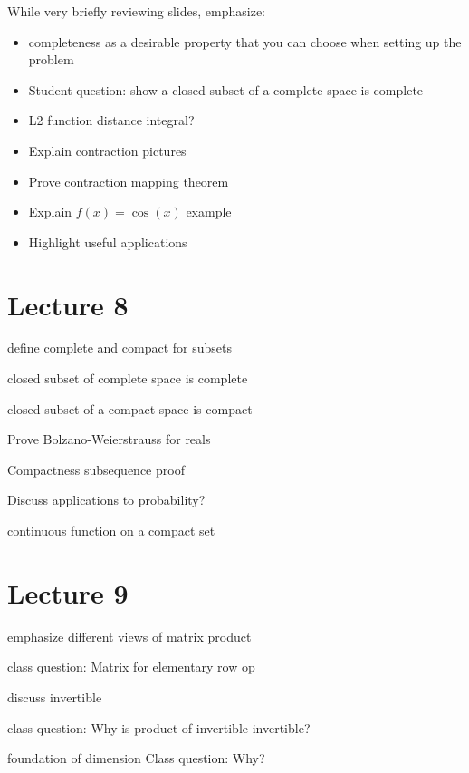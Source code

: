 \documentclass[10pt,english]{article}
\begin{document}
While very briefly reviewing slides,  emphasize:
\begin{itemize}
  \item completeness as a desirable property that you can choose when setting up the problem
  
  \item Student question: show a closed subset of a complete space is complete

  \item L2 function distance integral?

  \item Explain contraction pictures

  \item Prove contraction mapping theorem
  
  \item Explain $f(x) = \cos(x) $ example
  
  \item Highlight useful applications
\end{itemize}  

\section*{Lecture 8}

define complete and compact for subsets

closed subset of complete space is complete

closed subset of a compact space is compact

Prove Bolzano-Weierstrauss for reals

Compactness subsequence proof

Discuss applications to probability?

continuous function on a compact set

\section*{Lecture 9}

emphasize different views of matrix product

class question: Matrix for elementary row op

discuss invertible

class question: Why is product of invertible invertible?

foundation of dimension
Class question: Why?


  
%
%
\end{document}
